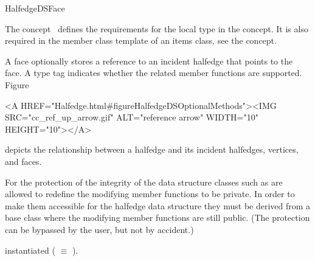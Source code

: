 
\ccRefPageBegin



\begin{ccRefConcept}{HalfedgeDSFace}
\label{pageHalfedgeDSItemsFaceRef}

\ccDefinition
  
The concept \ccRefName\ defines the requirements for the local  
type in the  concept. It is also required in 
the  member class template of an
items class, see the  concept.

A face optionally stores a reference to an incident halfedge that
points to the face.  A type tag indicates whether the related member
functions are supported. 
Figure~\begin{ccHtmlOnly}
  <A HREF="Halfedge.html#figureHalfedgeDSOptionalMethods"><IMG 
  SRC="cc_ref_up_arrow.gif" ALT="reference arrow" WIDTH="10" HEIGHT="10"></A>
\end{ccHtmlOnly}
depicts the relationship between a halfedge and its incident
halfedges, vertices, and faces.

For the protection of the integrity of the data structure classes such as
 are allowed to redefine the modifying member 
functions to be private. In order to make them accessible for the 
halfedge data structure they must be derived from a base class 
where the modifying member functions are still public. (The protection
can be bypassed by the user, but not by accident.)

\ccTypes

\ccThreeToTwo

    {instantiated  ( $\equiv$ ).}
\ccGlue
{}
\ccGlue
{}
\ccGlue
{}
\ccGlue
{}
\ccGlue
{}
\ccGlue
{}
\ccGlue
{}
\ccGlue
{}
\ccGlue
{}
\ccGlue
{}


\end{ccRefConcept}
